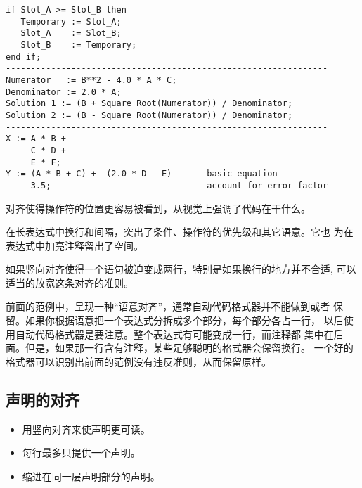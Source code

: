 \begin{blockindent}
\noindent
\begin{lstlisting}
if Slot_A >= Slot_B then
   Temporary := Slot_A;
   Slot_A    := Slot_B;
   Slot_B    := Temporary;
end if;
----------------------------------------------------------------
Numerator   := B**2 - 4.0 * A * C;
Denominator := 2.0 * A;
Solution_1 := (B + Square_Root(Numerator)) / Denominator;
Solution_2 := (B - Square_Root(Numerator)) / Denominator;
----------------------------------------------------------------
X := A * B +
     C * D +
     E * F;
Y := (A * B + C) +  (2.0 * D - E) -  -- basic equation
     3.5;                            -- account for error factor
\end{lstlisting}
\end{blockindent}

\begin{blockindent}
对齐使得操作符的位置更容易被看到，从视觉上强调了代码在干什么。

在长表达式中换行和间隔，突出了条件、操作符的优先级和其它语意。它也
为在表达式中加亮注释留出了空间。
\end{blockindent}

\begin{blockindent}
如果竖向对齐使得一个语句被迫变成两行，特别是如果换行的地方并不合适,
可以适当的放宽这条对齐的准则。
\end{blockindent}

\begin{blockindent}
前面的范例中，呈现一种``语意对齐''，通常自动代码格式器并不能做到或者
保留。如果你根据语意把一个表达式分拆成多个部分，每个部分各占一行，
以后使用自动代码格式器是要注意。整个表达式有可能变成一行，而注释都
集中在后面。但是，如果那一行含有注释，某些足够聪明的格式器会保留换行。
一个好的格式器可以识别出前面的范例没有违反准则，从而保留原样。
\end{blockindent}

\subsection{声明的对齐}
\begin{itemize}
    \item 用竖向对齐来使声明更可读。
    \item 每行最多只提供一个声明。
    \item 缩进在同一层声明部分的声明。
\end{itemize}


